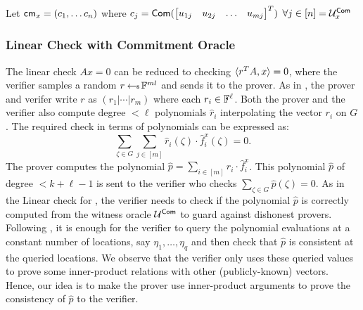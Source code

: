 Let $\mathsf{cm}_x=(c_1,\ldots c_n)$ where 
$c_j= \mathsf{Com}( \begin{bmatrix}
u_{1j} & u_{2j} & \ldots & u_{mj}
\end{bmatrix}^T)$ $\forall j\in [n]=\mathcal{U}^{\mathsf{Com}}_x$


\subsubsection{Linear Check with Commitment Oracle}\label{sec:lincheck2D}
The linear check $Ax=0$ can be reduced to checking $\langle r^TA,x\rangle=0$, where the verifier samples a random $r\hskip2.3pt{\gets\!\!\mbox{\tiny${\$}$\normalsize}}\, \mathbb{F}^{ml}$ and sends it to the prover. As in \cite{Ligero2017}, the prover and verifer write $r$ as $(r_{1}|\cdots|r_{m})$ where each $r_i\in \mathbb{F}^\ell$. Both the prover and the
verifier also compute degree $<\ell$ polynomials $\hat{r}_{i}$ interpolating the vector $r_{i}$ on $G$. The required check in terms of polynomials can be expressed as:
\begin{equation}\label{eq:lincheck2D}
\sum_{\zeta\in G}\sum_{j\in [m]}
\hat{r}_{i}(\zeta) \cdot \hat{f}^x_{i}(\zeta) = 0.
\end{equation}
The prover computes the polynomial $\hat{p}=\sum_{i\in[m]}\hat{r}_i \cdot \hat{f}^x_i$. This polynomial $\hat{p}$ of degree $< k+\ell-1$ is sent to the verifier who checks $\sum_{\zeta\in G}\hat{p}(\zeta)=0$. As in the Linear check for \cite{Ligero2017}, the verifier needs to check if the polynomial $\hat{p}$ is correctly computed from the witness oracle $\mathcal{U}^{\mathsf{Com}}$ to guard against dishonest provers. Following \cite{Ligero2017}, it is enough for the verifier to query the polynomial evaluations at a constant number of locations, say $\eta_1,\ldots,\eta_q$ and then check that $\hat{p}$ is consistent at the queried locations. We observe that the verifier only uses these queried values to prove some inner-product relations with other (publicly-known) vectors. Hence, our idea is to make the prover use inner-product arguments to prove the consistency of $\hat{p}$ to the verifier.

